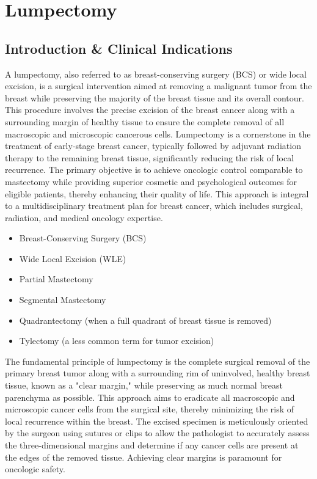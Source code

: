 \chapter{Lumpectomy}

\section*{Introduction \& Clinical Indications}
A lumpectomy, also referred to as breast-conserving surgery (BCS) or wide local excision, is a surgical intervention aimed at removing a malignant tumor from the breast while preserving the majority of the breast tissue and its overall contour. This procedure involves the precise excision of the breast cancer along with a surrounding margin of healthy tissue to ensure the complete removal of all macroscopic and microscopic cancerous cells. Lumpectomy is a cornerstone in the treatment of early-stage breast cancer, typically followed by adjuvant radiation therapy to the remaining breast tissue, significantly reducing the risk of local recurrence. The primary objective is to achieve oncologic control comparable to mastectomy while providing superior cosmetic and psychological outcomes for eligible patients, thereby enhancing their quality of life. This approach is integral to a multidisciplinary treatment plan for breast cancer, which includes surgical, radiation, and medical oncology expertise.

\begin{itemize}
  \item Breast-Conserving Surgery (BCS)
  \item Wide Local Excision (WLE)
  \item Partial Mastectomy
  \item Segmental Mastectomy
  \item Quadrantectomy (when a full quadrant of breast tissue is removed)
  \item Tylectomy (a less common term for tumor excision)
\end{itemize}

The fundamental principle of lumpectomy is the complete surgical removal of the primary breast tumor along with a surrounding rim of uninvolved, healthy breast tissue, known as a "clear margin," while preserving as much normal breast parenchyma as possible. This approach aims to eradicate all macroscopic and microscopic cancer cells from the surgical site, thereby minimizing the risk of local recurrence within the breast. The excised specimen is meticulously oriented by the surgeon using sutures or clips to allow the pathologist to accurately assess the three-dimensional margins and determine if any cancer cells are present at the edges of the removed tissue. Achieving clear margins is paramount for oncologic safety.

